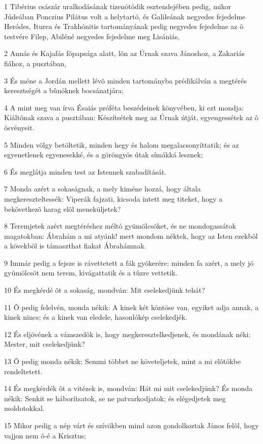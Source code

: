 \par 1 Tibérius császár uralkodásának tizenötödik esztendejében pedig, mikor Júdeában Ponczius Pilátus volt a helytartó, és Galileának negyedes fejedelme Heródes, Iturea és Trakhónitis tartományának pedig negyedes fejedelme az õ testvére Filep, Abiléné negyedes fejedelme meg Lisániás,
\par 2 Annás és Kajafás fõpapsága alatt, lõn az Úrnak szava Jánoshoz, a Zakariás fiához,  a pusztában,
\par 3 És méne a Jordán mellett lévõ minden tartományba prédikálván a megtérés keresztségét a bûnöknek bocsánatjára;
\par 4 A mint meg van írva Ésaiás próféta beszédeinek könyvében, ki ezt mondja: Kiáltónak szava a pusztában: Készítsétek meg az Úrnak útját, egyengessétek az õ ösvényeit.
\par 5 Minden völgy betöltetik, minden hegy és halom megalacsonyíttatik; és az egyenetlenek egyenesekké, és a göröngyös útak símákká lesznek;
\par 6 És meglátja minden test az Istennek szabadítását.
\par 7 Monda azért a sokaságnak, a mely kiméne hozzá, hogy általa megkereszteltessék: Viperák fajzati, kicsoda intett meg titeket, hogy a bekövetkezõ harag elõl meneküljetek?
\par 8 Teremjetek azért megtéréshez méltó gyümölcsöket, és ne mondogassátok magatokban: Ábrahám a mi atyánk! mert mondom néktek, hogy az Isten ezekbõl a kövekbõl is támaszthat fiakat Ábrahámnak.
\par 9 Immár pedig a fejsze is rávettetett a fák gyökerére: minden fa azért, a mely jó gyümölcsöt nem terem, kivágattatik és a tûzre vettetik.
\par 10 És megkérdé õt a sokaság, mondván: Mit cselekedjünk tehát?
\par 11 Õ pedig felelvén, monda nékik: A kinek két köntöse van, egyiket adja annak, a kinek nincs; és a kinek van eledele, hasonlókép cselekedjék.
\par 12 És eljövének a vámszedõk is, hogy megkeresztelkedjenek, és mondának néki: Mester, mit cselekedjünk?
\par 13 Õ pedig monda nékik: Semmi többet ne követeljetek, mint a mi elõtökbe rendeltetett.
\par 14 És megkérdék õt a vitézek is, mondván: Hát mi mit cselekedjünk? És monda nékik: Senkit se háborítsatok, se ne patvarkodjatok; és elégedjetek meg zsoldotokkal.
\par 15 Mikor pedig a nép várt és szívökben mind azon gondolkoztak János felõl, hogy vajjon nem õ-é a Krisztus;

